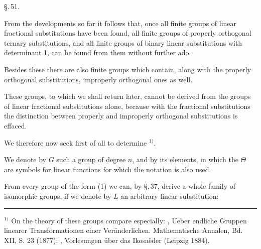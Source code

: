 \begin{center}
\S.\,51.


\end{center}

From the developments so far it follows that, once all finite
groups of linear fractional substitutions have been found, all
finite groups of properly orthogonal ternary substitutions, and
all finite groups of binary linear substitutions with determinant
1, can be found from them without further ado.

Besides these there are also finite groups which contain,
along with the properly orthogonal substitutions, improperly
orthogonal ones as well.

These groups, to which we shall return later, cannot be
derived from the groups of linear fractional substitutions alone,
because with the fractional substitutions the distinction between
properly and improperly orthogonal substitutions is effaced.

We therefore now seek first of all to determine  $^{1)}$.

We denote by $G$ such a group of degree $n$,
and by
its elements, in which the $\Theta$ are symbols for linear functions
for which the notation
is also used.

From every group of the form (1) we can, by \S.\,37, derive
a whole family of isomorphic groups, if we denote by
$L$ an arbitrary linear substitution:

\par\noindent\rule{4cm}{0.4pt}\par
$^{1)}$ On the theory of these groups compare especially:
, Ueber endliche Gruppen linearer Transformationen einer
Veränderlichen. Mathematische Annalen, Bd. XII, S. 23 (1877);
, Vorlesungen über das Ikosaëder (Leipzig 1884).
